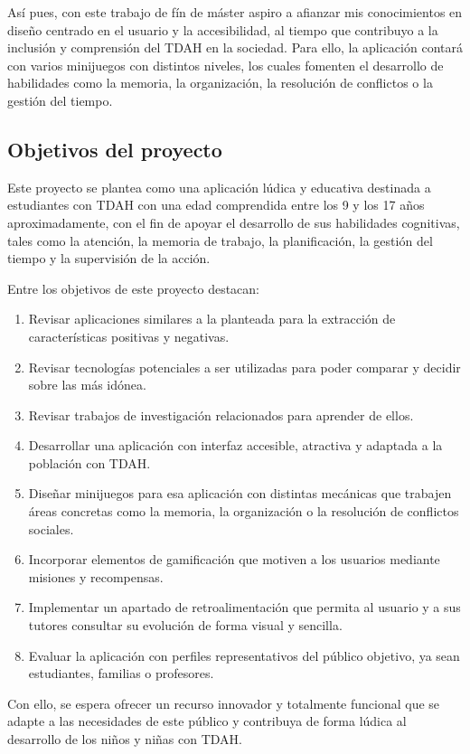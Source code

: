Así pues, con este trabajo de fín de máster aspiro a afianzar mis conocimientos en diseño centrado en el usuario y la accesibilidad, al tiempo que contribuyo a la inclusión y comprensión del TDAH en la sociedad. 
Para ello, la aplicación contará con varios minijuegos con distintos niveles, los cuales fomenten el desarrollo de habilidades como la memoria, la organización, la resolución de conflictos o la gestión del tiempo.

\newpage

\subsection{Objetivos del proyecto}
Este proyecto se plantea como una aplicación lúdica y educativa destinada a estudiantes con TDAH con una edad comprendida entre los 9 y los 17 años aproximadamente, con el fin de apoyar el desarrollo de sus habilidades cognitivas, tales como la atención, la memoria de trabajo, la planificación, la gestión del tiempo y la supervisión de la acción.

Entre los objetivos de este proyecto destacan:
\begin{enumerate}
    \item Revisar aplicaciones similares a la planteada para la extracción de características positivas y negativas.
    \item Revisar tecnologías potenciales a ser utilizadas para poder comparar y decidir sobre las más idónea.
    \item Revisar trabajos de investigación relacionados para aprender de ellos.
    \item Desarrollar una aplicación con interfaz accesible, atractiva y adaptada a la población con TDAH.
    \item Diseñar minijuegos para esa aplicación con distintas mecánicas que trabajen áreas concretas como la memoria, la organización o la resolución de conflictos sociales.
    \item Incorporar elementos de gamificación que motiven a los usuarios mediante misiones y recompensas.
    \item Implementar un apartado de retroalimentación que permita al usuario y a sus tutores consultar su evolución de forma visual y sencilla.
    \item Evaluar la aplicación con perfiles representativos del público objetivo, ya sean estudiantes, familias o profesores.
\end{enumerate}

Con ello, se espera ofrecer un recurso innovador y totalmente funcional que se adapte a las necesidades de este público y contribuya de forma lúdica al desarrollo de los niños y niñas con TDAH.
\newpage

